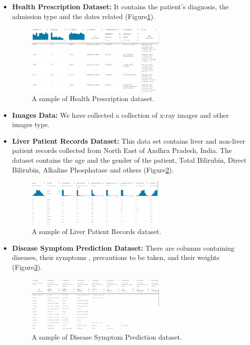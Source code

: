 \begin{itemize}
   \item \textbf{Health Prescription Dataset: }It contains the patient's diagnosis, the admission type and the dates related (Figure\ref{fig:presc}).
   \begin{figure}[h!]
    \center
    \includegraphics[width=0.65\textwidth]{images/chapter3/dataset/healthprescription.PNG}
    \caption{A sample of Health Prescription dataset.}
    \label{fig:presc}
  \end{figure}
  \item \textbf{Images Data:} We have collected a collection of x-ray images and other images type.
  \newpage
  \item \textbf{Liver Patient Records Dataset:} This data set contains liver and non-liver patient records collected from North East of Andhra Pradesh, India. The dataset contains the age and the gender of the patient, Total Bilirubin, Direct Bilirubin, Alkaline Phosphatase and others (Figure\ref{fig:liver}).
  \begin{figure}[h!]
    \center
    \includegraphics[width=0.65\textwidth]{images/chapter3/dataset/indianliver.PNG}
    \caption{A sample of Liver Patient Records dataset.}
    \label{fig:liver}
  \end{figure}
  \item \textbf{Disease Symptom Prediction Dataset:} There are columns containing diseases, their symptoms , precautions to be taken, and their weights (Figure\ref{fig:simptoms}).
  \begin{figure}[h!]
    \center
    \includegraphics[width=0.65\textwidth]{images/chapter3/dataset/simptoms.PNG}
    \caption{A sample of Disease Symptom Prediction dataset.}
    \label{fig:simptoms}
  \end{figure}
  

\end{itemize}

